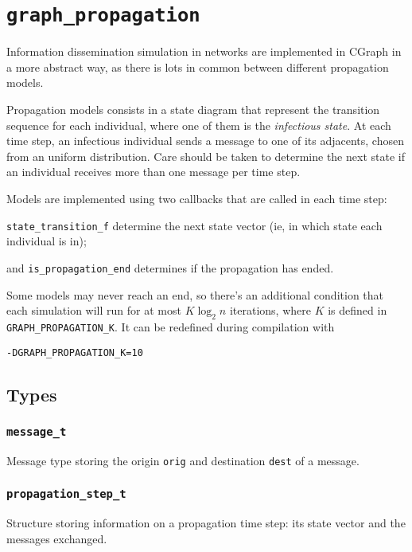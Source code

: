 \section{\texttt{graph\_propagation}}

Information dissemination simulation in networks are implemented in
CGraph in a more abstract way, as there is lots in common between 
different propagation models.

Propagation models consists in a state diagram that represent the
transition sequence for each individual, where one of them is 
the \textit{infectious state}. At each time step, an infectious individual 
sends a message to one of its adjacents, chosen from an uniform distribution.
Care should be taken to determine the next state if an individual receives
more than one message per time step.

Models are implemented using two callbacks that are called in each time step: 

\texttt{state\_transition\_f} determine the next state vector (ie, in which 
state each individual is in);

and \texttt{is\_propagation\_end} determines if the propagation has ended. 

Some models may never reach an end, so there's an additional condition that 
each simulation will run for at most $K \log_2 n$ iterations, where $K$ is 
defined in \texttt{GRAPH\_PROPAGATION\_K}. It can be redefined during
compilation with 

\texttt{-DGRAPH\_PROPAGATION\_K=10}

\subsection{Types}

\subsubsection{\texttt{message\_t}}

Message type storing the origin \texttt{orig} and destination \texttt{dest} of
a message.

\subsubsection{\texttt{propagation\_step\_t}}

Structure storing information on a propagation time step: its state vector
and the messages exchanged.

